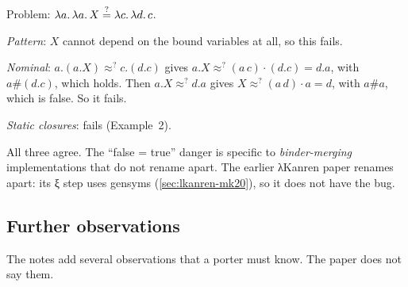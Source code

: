\begin{tutorial}[Counter-example 3: \enquote{true = false} is a bug of binder-merging, not of pattern unification]
Problem: $\lambda a.\,\lambda a.\,X\stackrel{?}{=}\lambda c.\,\lambda d.\,c$.

\emph{Pattern}: $X$ cannot depend on the bound variables at all, so this fails.

\emph{Nominal}: $a.(a.X)\approx^? c.(d.c)$ gives $a.X\approx^?(a\,c)\cdot(d.c)=d.a$, with
$a\#(d.c)$, which holds. Then $a.X\approx^?d.a$ gives $X\approx^?(a\,d)\cdot a=d$, with
\textbf{$a\#a$}, which is false. So it fails.

\emph{Static closures}: fails (Example~2).

All three agree. The \enquote{false = true} danger is specific to \emph{binder-merging}
implementations that do not rename apart. The earlier λKanren paper renames apart: its ξ step uses
gensyms (\cref{sec:lkanren-mk20}), so it does not have the bug.
\end{tutorial}

\subsection{Further observations}

The notes add several observations that a porter must know. The paper does not say them.

